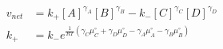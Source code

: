 \begin{eqnarray}
v_{net} & = k_+[A]^{\gamma_A}[B]^{\gamma_B} - k_-[C]^{\gamma_C}[D]^{\gamma_D} \\
k_+ &=  k_-e^{\frac{1}{RT}\left(\gamma_C\mu_C^\circ+ \gamma_D\mu_D^\circ -\gamma_A\mu_A^\circ-\gamma_B\mu_B^\circ\right)} \\
\end{eqnarray}